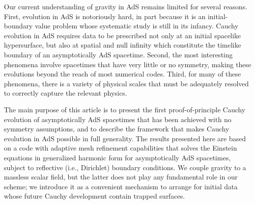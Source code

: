 \documentclass[a4paper,11pt]{article}
\numberwithin{equation}{section}
\begin{document}
Our current understanding of gravity in AdS remains limited for several reasons.
First, evolution in AdS is notoriously hard, in part because it is an initial-boundary value problem whose systematic study is still in its infancy. 
Cauchy evolution in AdS requires data to be prescribed not only at an initial spacelike hypersurface, but also at spatial and null infinity which constitute the timelike boundary of an asymptotically AdS spacetime.
Second, the most interesting phenomena involve spacetimes that have very little or no symmetry, making these evolutions beyond the reach of most numerical codes. 
Third, for many of these phenomena, there is a variety of physical scales that must be adequately resolved to correctly capture the relevant physics.

The main purpose of this article is to present the first proof-of-principle Cauchy evolution of asymptotically AdS spacetimes that has been achieved with no symmetry assumptions, and to describe the framework that makes Cauchy evolution in AdS possible in full generality.
The results presented here are based on a code with adaptive mesh refinement capabilities that solves the Einstein equations in generalized harmonic form for asymptotically AdS spacetimes, subject to reflective (i.e., Dirichlet) boundary conditions. We couple gravity to a massless scalar field, 
but the latter does not play any fundamental role in our scheme; we introduce it as a convenient mechanism to arrange for initial data whose future Cauchy development contain trapped surfaces.
\end{document}
